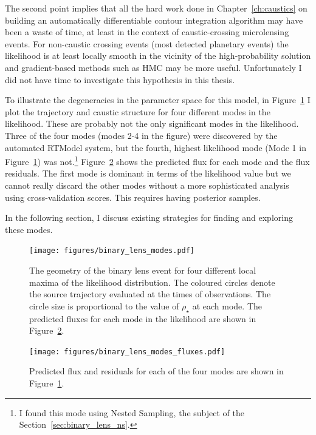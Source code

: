 \documentclass[12pt,dvipsnames]{report}
\begin{document}
The second point implies that all the hard work done in Chapter~\ref{ch:caustics} on building
an automatically differentiable contour integration algorithm may have been a waste of time, 
at least in the context of caustic-crossing microlensing events. For non-caustic crossing 
events (most detected planetary events) the likelihood is at least locally smooth in the 
vicinity of the high-probability solution and gradient-based methods
such as HMC may be more useful. Unfortunately I did not have time to investigate this 
hypothesis in this thesis.

To illustrate the degeneracies in the parameter space for this model, in 
Figure~\ref{fig:binary_lens_modes} I plot the 
trajectory and caustic structure for four different modes in the likelihood.
 These are probably not the only significant modes in the likelihood. 
Three of the four modes (modes 2-4 in the figure) were discovered by the automated RTModel 
system, but the fourth, highest likelihood mode (Mode 1 in Figure~\ref{fig:binary_lens_modes}) 
was not.\footnote{I found this mode using Nested Sampling, the subject of the 
Section~\ref{sec:binary_lens_ns}.} Figure~\ref{fig:binary_lens_modes_fluxes} 
shows the predicted flux for each mode and the flux residuals. 
The first mode is dominant in terms of the likelihood value but we cannot really
discard the other modes without a more sophisticated analysis using cross-validation
scores. This requires having posterior samples.

In the following section, I discuss existing strategies for finding and exploring these 
modes.
\begin{figure}[t]
    \begin{centering}
        \texttt{[image: figures/binary\_lens\_modes.pdf]}
        \caption{
            The geometry of the binary lens event for four different local maxima of the likelihood
            distribution. The coloured circles denote the source trajectory evaluated at 
            the times of observations. The circle size is proportional to the value of 
            $\rho_\star$ at each mode. The predicted fluxes for each mode in the likelihood 
            are shown in Figure~\ref{fig:binary_lens_modes_fluxes}.
        }
            \label{fig:binary_lens_modes}
    \end{centering}
\end{figure}

\begin{figure}[t]
    \begin{centering}
        \texttt{[image: figures/binary\_lens\_modes\_fluxes.pdf]}
        \caption{
            Predicted flux and residuals for each of the four modes are shown in 
            Figure~\ref{fig:binary_lens_modes}.
        }
            \label{fig:binary_lens_modes_fluxes}
    \end{centering}
\end{figure}
\end{document}
